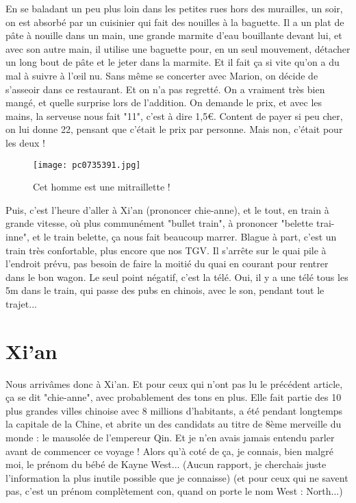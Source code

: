 \documentclass{book}
\begin{document}
En se baladant un peu plus loin dans les petites rues hors des murailles, un soir, on est absorbé par un cuisinier qui fait des nouilles à la baguette. Il a un plat de pâte à nouille dans un main, une grande marmite d'eau bouillante devant lui, et avec son autre main, il utilise une baguette pour, en un seul mouvement, détacher un long bout de pâte et le jeter dans la marmite. Et il fait ça si vite qu'on a du mal à suivre à l’œil nu. Sans même se concerter avec Marion, on décide de s'asseoir dans ce restaurant. Et on n'a pas regretté. On a vraiment très bien mangé, et quelle surprise lors de l'addition. On demande le prix, et avec les mains, la serveuse nous fait "11", c'est à dire 1,5\euro. Content de payer si peu cher, on lui donne 22, pensant que c'était le prix par personne. Mais non, c'était pour les deux !


\begin{figure}[h]
\centering
\texttt{[image: pc0735391.jpg]}
\caption*{Cet homme est une mitraillette !}
\end{figure}

Puis, c'est l'heure d'aller à Xi'an (prononcer chie-anne), et le tout, en train à grande vitesse, où plus communément "bullet train", à prononcer "belette trai-inne", et le train belette, ça nous fait beaucoup marrer. Blague à part, c'est un train très confortable, plus encore que nos TGV. Il s'arrête sur le quai pile à l'endroit prévu, pas besoin de faire la moitié du quai en courant pour rentrer dans le bon wagon. Le seul point négatif, c'est la télé. Oui, il y a une télé tous les 5m dans le train, qui passe des pubs en chinois, avec le son, pendant tout le trajet...



\chapter{Xi'an}
Nous arrivâmes donc à Xi'an. Et pour ceux qui n'ont pas lu le précédent article, ça se dit "chie-anne", avec probablement des tons en plus. Elle fait partie des 10 plus grandes villes chinoise avec 8 millions d'habitants, a été pendant longtemps la capitale de la Chine, et abrite un des candidats au titre de 8ème merveille du monde : le mausolée de l'empereur Qin. Et je n'en avais jamais entendu parler avant de commencer ce voyage ! Alors qu'à coté de ça, je connais, bien malgré moi, le prénom du bébé de Kayne West... (Aucun rapport, je cherchais juste l'information la plus inutile possible que je connaisse) (et pour ceux qui ne savent pas, c'est un prénom complètement con, quand on porte le nom West : North...)
\end{document}
